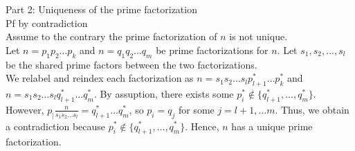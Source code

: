 \documentclass[10pt]{article}
\begin{document}
Part 2: Uniqueness of the prime factorization\\
Pf by contradiction\\
Assume to the contrary the prime factorization of $n$ is not unique.\\
Let $n=p_1p_2\ldots p_k$ and $n=q_1q_2\ldots q_m$ be prime factorizations for $n$. 
Let $s_1,s_2,\ldots,s_l$ be the shared prime factors between the two factorizations.\\
We relabel and reindex each factorization as $n=s_1s_2\ldots s_l p^*_{l+1}\ldots p^*_k$ and $n=s_1s_2\ldots s_l q^*_{l+1}\ldots q^*_m$.
By assuption, there exists some $p^*_i\notin \{q^*_{l+1},\ldots, q^*_m\}$. 
However, $p_\mid \frac{n}{s_1s_2\ldots s_l}=q^*_{l+1}\ldots q^*_m$, so $p_i=q_j$ for some $j=l+1,\ldots m$.
Thus, we obtain a contradiction because $p^*_i\notin \{q^*_{l+1},\ldots, q^*_m\}$.
Hence, $n$ has a unique prime factorization.
\end{document}
